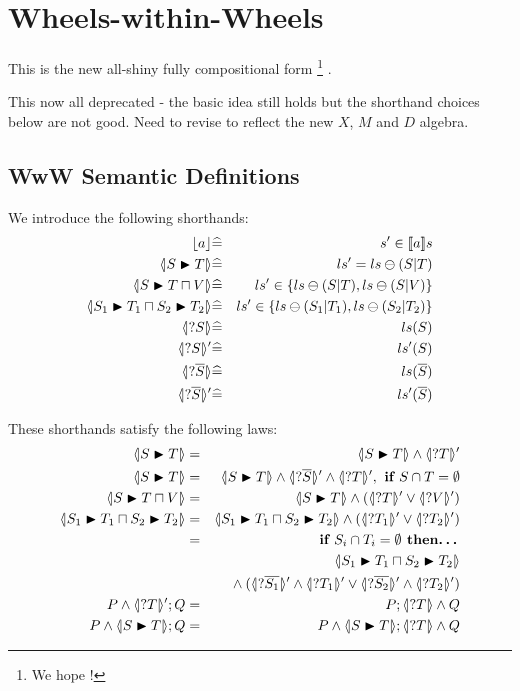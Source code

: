 \section{Wheels-within-Wheels}

This is the new all-shiny fully compositional form%
\footnote{We hope !}%
.

This now all deprecated - the basic idea still holds
but the shorthand choices below are not good.
Need to revise to reflect the new $X$, $M$ and $D$ algebra.

\subsection{WwW Semantic Definitions}

We introduce the following shorthands:
\begin{eqnarray*}
   \ado a &\defs& \atomdo a
\\ \LUPD S T &\defs& \lupd S T
\\ \LUPD S {T \ndc V}
   &\defs&
   ls' \in \setof{\lexc S T, \lexc S V}
\\ \LNDC{S_1}{T_1}{S_2}{T_2}
   &\defs&
   ls' \in \setof{\lexc{S_1}{T_1}, \lexc{S_2}{T_2}}
\\ \LS S &\defs& ls(S)
\\ \LSd S &\defs& ls'(S)
\\ \LS{\B S} &\defs& ls(\B S)
\\ \LSd{\B S} &\defs& ls'(\B S)
\end{eqnarray*}

These  shorthands satisfy the following laws:
\begin{eqnarray*}
   \LUPD S T &=& \LUPD S T \land \LSd T
\\ \LUPD S T &=& \LUPD S T \land \LSd{\B S} \land \LSd T, \textbf{ if }S \cap T = \emptyset
\\ \LUPD S {T\ndc V} &=& \LUPD S T \land (\LSd T \lor \LSd V)
\\ \LNDC{S_1}{T_1}{S_2}{T_2}
   &=&
   \LNDC{S_1}{T_1}{S_2}{T_2}  \land (\LSd{T_1} \lor \LSd{T_2})
\\ &=& \textbf{ if }S_i \cap T_i = \emptyset \textbf{ then\ldots}
\\&& \LNDC{S_1}{T_1}{S_2}{T_2}
\\&& {} \land (\LSd{\B{S_1}}\land\LSd{T_1}
            \lor
            \LSd{\B{S_2}}\land\LSd{T_2})
\\ P \land \LSd T ; Q
   &=&
   P ; \LS T \land Q
\\ P \land \LUPD S T ; Q
   &=&
   P \land \LUPD S T ; \LS T \land Q
\end{eqnarray*}

